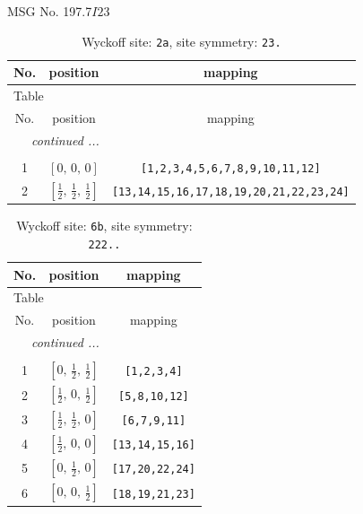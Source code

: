 \documentclass[fleqn,8pt]{jsarticle}
\begin{document}
\setcounter{MaxMatrixCols}{32}

\renewcommand{\tablename}{Table~}
\renewcommand{\figurename}{Figure~}
\begin{center}
\LARGE
MSG No. 197.7\quad$I23$
\end{center}
\renewcommand{\arraystretch}{1.2}
\begin{longtable}{ccc}
\caption{Wyckoff site: {\tt 2a}, site symmetry: {\tt 23.}}
 \\
 \hline \hline
No. & position & mapping \\ \hline \endfirsthead

\multicolumn{2}{l}{\tablename\ \thetable{}} \\
 \hline \hline
No. & position & mapping \\ \hline \endhead

 \hline \hline
\multicolumn{2}{r}{\footnotesize\it continued ...} \\ \endfoot

 \hline \hline
\multicolumn{2}{r}{} \\ \endlastfoot

1 & $\left[ 0,\, 0,\, 0 \right]$ & {\tt [1,2,3,4,5,6,7,8,9,10,11,12]} \\ \hline
2 & $\left[ \frac{1}{2},\, \frac{1}{2},\, \frac{1}{2} \right]$ & {\tt [13,14,15,16,17,18,19,20,21,22,23,24]} \\
\end{longtable}
\renewcommand{\arraystretch}{1.2}
\begin{longtable}{ccc}
\caption{Wyckoff site: {\tt 6b}, site symmetry: {\tt 222..}}
 \\
 \hline \hline
No. & position & mapping \\ \hline \endfirsthead

\multicolumn{2}{l}{\tablename\ \thetable{}} \\
 \hline \hline
No. & position & mapping \\ \hline \endhead

 \hline \hline
\multicolumn{2}{r}{\footnotesize\it continued ...} \\ \endfoot

 \hline \hline
\multicolumn{2}{r}{} \\ \endlastfoot

1 & $\left[ 0,\, \frac{1}{2},\, \frac{1}{2} \right]$ & {\tt [1,2,3,4]} \\ \hline
2 & $\left[ \frac{1}{2},\, 0,\, \frac{1}{2} \right]$ & {\tt [5,8,10,12]} \\ \hline
3 & $\left[ \frac{1}{2},\, \frac{1}{2},\, 0 \right]$ & {\tt [6,7,9,11]} \\ \hline
4 & $\left[ \frac{1}{2},\, 0,\, 0 \right]$ & {\tt [13,14,15,16]} \\ \hline
5 & $\left[ 0,\, \frac{1}{2},\, 0 \right]$ & {\tt [17,20,22,24]} \\ \hline
6 & $\left[ 0,\, 0,\, \frac{1}{2} \right]$ & {\tt [18,19,21,23]} \\
\end{longtable}
\end{document}

